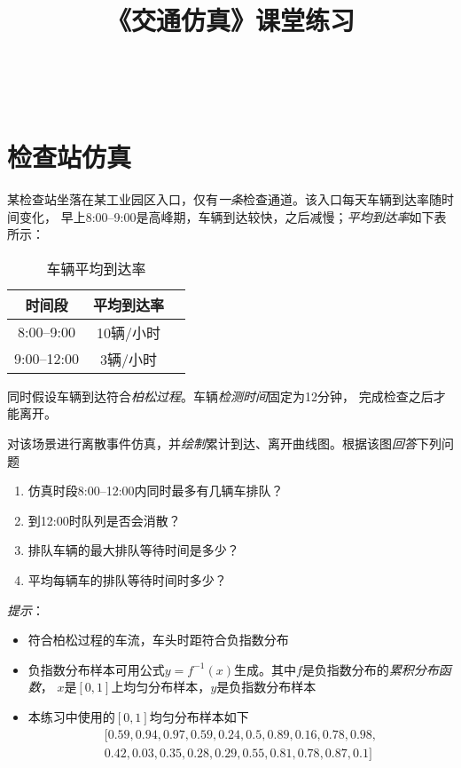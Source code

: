 \documentclass[12pt]{article}
\title{《交通仿真》课堂练习}
\makeatletter
\renewcommand\maketitle{
\begin{center}
{\LARGE \bfseries \@title}\\[2ex]
\end{center}
}
\makeatother
\begin{document}
\maketitle

\section{检查站仿真}

某检查站坐落在某工业园区入口，仅有\emph{一条}检查通道。该入口每天车辆到达率随时间变化，
早上8:00--9:00是高峰期，车辆到达较快，之后减慢；\emph{平均到达率}如下表所示：
\begin{table}[htbp]
    \begin{center}
    \begin{tabular}{ c c c }
        时间段 & 平均到达率 \\
        \hline
        8:00--9:00 & 10辆/小时 \\
        9:00--12:00 & 3辆/小时 \\
    \end{tabular}
    \end{center}
    \caption{车辆平均到达率}
\end{table}

\noindent 同时假设车辆到达符合\emph{柏松过程}。车辆\emph{检测时间}固定为12分钟，
完成检查之后才能离开。

对该场景进行离散事件仿真，并\emph{绘制}累计到达、离开曲线图。根据该图\emph{回答}下列问题
\begin{enumerate}
    \item 仿真时段8:00--12:00内同时最多有几辆车排队？
    \item 到12:00时队列是否会消散？
    \item 排队车辆的最大排队等待时间是多少？
    \item 平均每辆车的排队等待时间时多少？
\end{enumerate}

\emph{提示}：
\begin{itemize}
    \item 符合柏松过程的车流，车头时距符合负指数分布
    \item 负指数分布样本可用公式$y=f^{-1}(x)$生成。其中$f$是负指数分布的\emph{累积分布函数}，
    $x$是$[0,1]$上均匀分布样本，$y$是负指数分布样本
    \item 本练习中使用的$[0,1]$均匀分布样本如下
    \begin{equation*}
        \begin{split}
    [0.59, 0.94, 0.97, 0.59, 0.24, 0.5 , 0.89, 0.16, 0.78, 0.98, \\
    0.42, 0.03, 0.35, 0.28, 0.29, 0.55, 0.81, 0.78, 0.87, 0.1 ]
        \end{split}
    \end{equation*}
\end{itemize}
\end{document}
